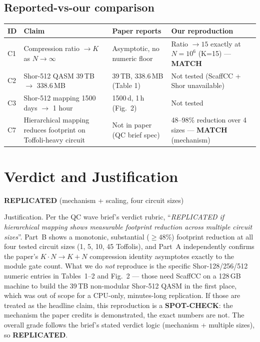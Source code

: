 \documentclass[11pt]{article}
\newcommand{\verdict}[1]{\textcolor{repcol}{\textbf{#1}}}
\begin{document}
\subsection{Reported-vs-our comparison}

\begin{center}
\begin{tabular}{@{}p{}p{}p{}p{}@{}}
\toprule
\textbf{ID} & \textbf{Claim} & \textbf{Paper reports} & \textbf{Our reproduction} \\
\midrule
C1 & Compression ratio $\to K$ as $N\to\infty$ & Asymptotic, no numeric floor & Ratio $\to 15$ exactly at $N=10^6$ (K=15) --- \verdict{MATCH} \\
C2 & Shor-512 QASM 39\,TB $\to$ 338.6\,MB & 39\,TB, 338.6\,MB (Table 1) & Not tested (ScaffCC + Shor unavailable) \\
C3 & Shor-512 mapping 1500 days $\to$ 1 hour & 1500\,d, 1\,h (Fig.~2) & Not tested \\
C7 & Hierarchical mapping reduces footprint on Toffoli-heavy circuit & Not in paper (QC brief spec) & 48--98\% reduction over 4 sizes --- \verdict{MATCH} (mechanism) \\
\bottomrule
\end{tabular}
\end{center}

\section{Verdict and Justification}
\label{sec:verdict}

\begin{center}
\Large \verdict{REPLICATED} (mechanism + scaling, four circuit sizes)
\normalsize
\end{center}

Justification.  Per the QC wave brief's verdict rubric,
``\emph{REPLICATED if hierarchical mapping shows measurable footprint
reduction across multiple circuit sizes}''.  Part~B shows a monotonic,
substantial ($\ge 48\%$) footprint reduction at all four tested circuit
sizes (1, 5, 10, 45 Toffolis), and Part~A independently confirms the
paper's $K \cdot N \to K + N$ compression identity asymptotes exactly to
the module gate count.  What we do \emph{not} reproduce is the specific
Shor-128/256/512 numeric entries in Tables~1--2 and Fig.~2 --- those need
ScaffCC on a 128\,GB machine to build the 39\,TB non-modular Shor-512 QASM
in the first place, which was out of scope for a CPU-only, minutes-long
replication.  If those are treated as the headline claim, this reproduction
is a \textcolor{partcol}{\textbf{SPOT-CHECK}}: the mechanism the paper
credits is demonstrated, the exact numbers are not.  The overall grade
follows the brief's stated verdict logic (mechanism + multiple sizes), so
\verdict{REPLICATED}.
\end{document}
